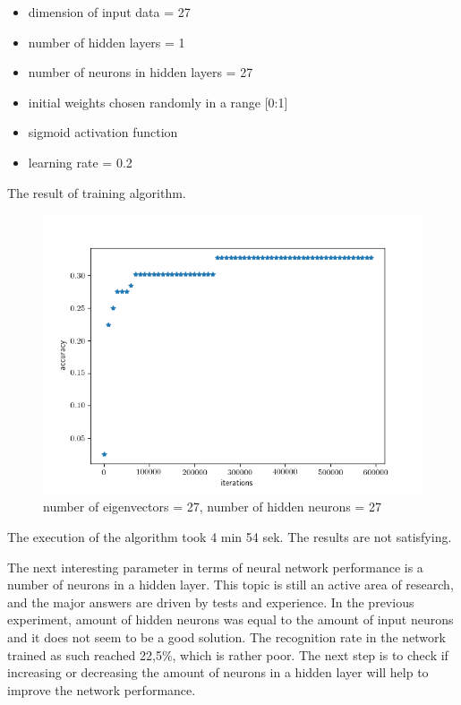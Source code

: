 \begin{itemize}
\itemsep0em
\item dimension of input data = 27
\item number of hidden layers = 1
\item number of neurons in hidden layers = 27
\item initial weights chosen randomly in a range [0:1]
\item sigmoid activation function
\item learning rate = 0.2
\end{itemize}

The result of training algorithm. 

\begin{figure}[H]
\centering
\includegraphics[scale=0.5]{img/tests/40ppl/k=27,h=27,60000epoch/res.png}
\caption{number of eigenvectors = 27, number of hidden neurons = 27}
\end{figure} 

The execution of the algorithm took 4 min 54 sek. The results are not satisfying.  

The next interesting parameter in terms of neural network performance is a number of neurons in a hidden layer. This topic is still an active area of research, and the major answers are driven by tests and experience. In the previous experiment, amount of hidden neurons was equal to the amount of input neurons and it does not seem to be a good solution. The recognition rate in the network trained as such reached 22,5\%, which is rather poor. The next step is to check if increasing or decreasing the amount of neurons in a hidden layer will help to improve the network performance. 


